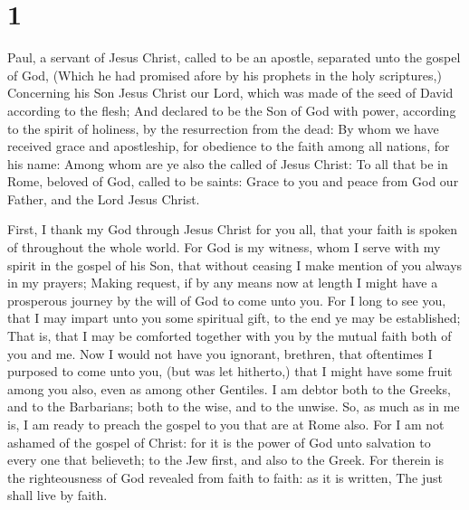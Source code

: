 \hypertarget{section}{%
\section{1}\label{section}}

 Paul, a servant of Jesus Christ, called to be an apostle,
separated unto the gospel of God,  (Which he had promised
afore by his prophets in the holy scriptures,)  Concerning
his Son Jesus Christ our Lord, which was made of the seed of David
according to the flesh;  And declared to be the Son of God
with power, according to the spirit of holiness, by the resurrection
from the dead:  By whom we have received grace and
apostleship, for obedience to the faith among all nations, for his name:
 Among whom are ye also the called of Jesus Christ:
 To all that be in Rome, beloved of God, called to be
saints: Grace to you and peace from God our Father, and the Lord Jesus
Christ.

 First, I thank my God through Jesus Christ for you all,
that your faith is spoken of throughout the whole world. 
For God is my witness, whom I serve with my spirit in the gospel of his
Son, that without ceasing I make mention of you always in my prayers;
 Making request, if by any means now at length I might
have a prosperous journey by the will of God to come unto you.
 For I long to see you, that I may impart unto you some
spiritual gift, to the end ye may be established;  That
is, that I may be comforted together with you by the mutual faith both
of you and me.  Now I would not have you ignorant,
brethren, that oftentimes I purposed to come unto you, (but was let
hitherto,) that I might have some fruit among you also, even as among
other Gentiles.  I am debtor both to the Greeks, and to
the Barbarians; both to the wise, and to the unwise.  So,
as much as in me is, I am ready to preach the gospel to you that are at
Rome also.  For I am not ashamed of the gospel of Christ:
for it is the power of God unto salvation to every one that believeth;
to the Jew first, and also to the Greek.  For therein is
the righteousness of God revealed from faith to faith: as it is written,
The just shall live by faith.

